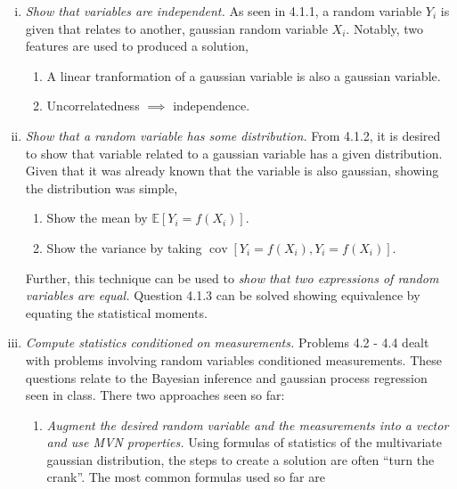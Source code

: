 \documentclass{article}[12pt]
\begin{document}
\begin{enumerate}[(i)]
	\item \textit{Show that variables are independent.}  As seen in 4.1.1, a random variable $Y_i$ is given that relates to another, gaussian random variable $X_i$. Notably, two features are used to produced a solution,
		\begin{enumerate}
			\item A linear tranformation of a gaussian variable is also a gaussian variable.
			\item Uncorrelatedness $\implies$ independence.
		\end{enumerate}	
	\item \textit{Show that a random variable has some distribution.} From 4.1.2, it is desired to show that variable related to a gaussian variable has a given distribution. Given that it was already known that the variable is also gaussian, showing the distribution was simple,
		\begin{enumerate}
			\item Show the mean by $\mathbb E \left[ Y_i = f(X_i) \right]$.
			\item Show the variance by taking $\operatorname{cov} \left[ Y_i = f(X_i), Y_i = f(X_i) \right]$.
		\end{enumerate}
		Further, this technique can be used to \textit{show that two expressions of random variables are equal.} Question 4.1.3 can be solved showing equivalence by equating the statistical moments.
	\item \textit{Compute statistics conditioned on measurements.} Problems 4.2 - 4.4 dealt with problems involving random variables conditioned measurements. These questions relate to the Bayesian inference and gaussian process regression seen in class. There two approaches seen so far: 

		\begin{enumerate}
			\item \textit{Augment the desired random variable and the measurements into a vector and use MVN properties.} Using formulas of statistics of the multivariate gaussian distribution, the steps to create a solution are often ``turn the crank''. The most common formulas used so far are
	

\end{enumerate}
\end{enumerate}
\end{document}
